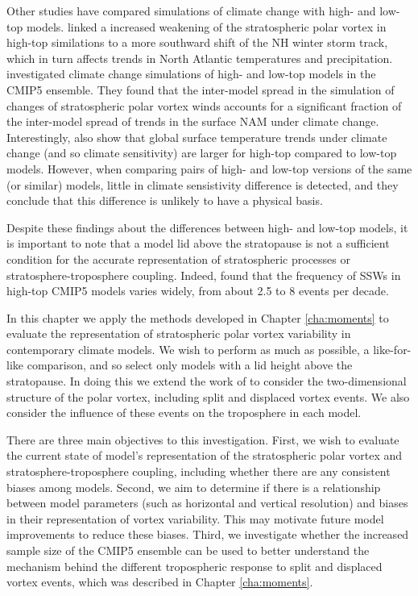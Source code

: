 Other studies have compared simulations of climate change with high- and low-top
models. \citet{Huebener2007} linked a increased weakening of the stratospheric
polar vortex in high-top similations to a more southward shift of the NH winter
storm track, which in turn affects trends in North Atlantic temperatures and
precipitation. \citet{Manzini2014} investigated climate change simulations of
high- and low-top models in the CMIP5 ensemble. They found that the inter-model
spread in the simulation of changes of stratospheric polar vortex winds accounts
for a significant fraction of the inter-model spread of trends in the surface
NAM under climate change. Interestingly, \citet{Manzini2014} also show that
global surface temperature trends under climate change (and so climate
sensitivity) are larger for high-top compared to low-top models. However, when
comparing pairs of high- and low-top versions of the same (or similar) models,
little in climate sensistivity difference is detected, and they conclude that
this difference is unlikely to have a physical basis.

Despite these findings about the differences between high- and low-top models,
it is important to note that a model lid above the stratopause is not a
sufficient condition for the accurate representation of stratospheric processes
or stratosphere-troposphere coupling. Indeed, \citet{Charlton-Perez2013} found
that the frequency of SSWs in high-top CMIP5 models varies widely, from about
2.5 to 8 events per decade. 

In this chapter we apply the methods developed in Chapter \ref{cha:moments} to
evaluate the representation of stratospheric polar vortex variability in
contemporary climate models. We wish to perform as much as possible, a
like-for-like comparison, and so select only models with a lid height above the
stratopause. In doing this we extend the work of \citet{Charlton-Perez2013} to
consider the two-dimensional structure of the polar vortex, including split and
displaced vortex events. We also consider the influence of these events on the
troposphere in each model. 

There are three main objectives to this investigation. First, we wish to
evaluate the current state of model's representation of the stratospheric polar
vortex and stratosphere-troposphere coupling, including whether there are any
consistent biases among models. Second, we aim to determine if there is a
relationship between model parameters (such as horizontal and vertical
resolution) and biases in their representation of vortex variability. This may
motivate future model improvements to reduce these biases. Third, we investigate
whether the increased sample size of the CMIP5 ensemble can be used to better
understand the mechanism behind the different tropospheric response to split and
displaced vortex events, which was described in Chapter \ref{cha:moments}. 

